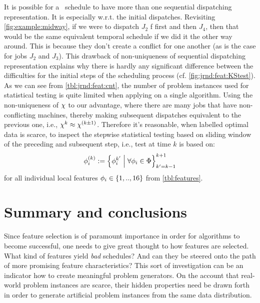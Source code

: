 It is possible for a \JSP\ schedule to have more than one sequential 
dispatching representation. It is especially w.r.t. the initial dispatches. 
Revisiting \cref{fig:example:midway}, if we were to dispatch $J_2$ f
first and then $J_4$, then that would be the same equivalent
temporal schedule if we did it the other way around. 
This is because they don't create a conflict for one another 
(as is the case for jobs $J_2$ and $J_3$). This drawback of non-uniqueness of 
sequential dispatching representation explains why there is hardly any 
significant difference between the difficulties for the initial steps of the 
scheduling process (cf. \cref{fig:jrnd:feat:KStest}).
As we can see from \cref{tbl:jrnd:feat:cnt}, the number of problem instances 
used for statistical testing is quite limited when applying on a single 
algorithm. 
Using the non-uniqueness of ${\mathbf{\chi}}$ to our advantage, where there are many jobs 
that have non-conflicting machines, thereby making subsequent dispatches 
equivalent to the previous one, i.e., ${\mathbf{\chi}}^k \approx  {\mathbf{\chi}}^{(k\pm1)}$. 
Therefore it's reasonable, when labelled optimal data is scarce, to inspect the 
stepwise statistical testing based on sliding window of the preceding and 
subsequent step, i.e., test at time $k$ is based on: 
\begin{equation}
{\mathbf{\phi}}_i^{(k)} := \left\{\phi_i^{k'}\;\middle|\;\forall \phi_i\in\Phi\right\}_{k'=k-1}^{k+1} 
\end{equation}
for all individual local features $\phi_i\in\{1,..,16\}$ from 
\cref{tbl:features}.


\section{Summary and conclusions}


Since feature selection is of paramount importance in order for algorithms to 
become successful, one needs to give great thought to how features are 
selected. What kind of features yield \emph{bad} schedules? And can they be 
steered onto the path of more promising feature characteristics? This sort of 
investigation can be an indicator how to create meaningful problem generators. 
On the account that real-world problem instances are scarce, their hidden 
properties need be drawn forth in order to generate artificial problem 
instances from the same data distribution. 

